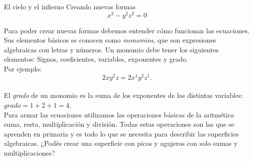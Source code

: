 \begin{surferPage}{El cielo y el infierno}
Creando nuevas formas \\
\smallskip
\[x^2	- y^2z^2	= 0\]

\singlespacing
Para poder crear nuevas formas debemos entender cómo funcionan las ecuaciones. Sus elementos básicos se conocen como  {\it monomios}, que son expresiones algebraicas con letras y números.
\singlespacing
Un monomio debe tener los siguientes elementos:
Signos, coeficientes, variables, exponentes y grado.\\
\singlespacing
Por ejemplo: 
\smallskip
\[2xy^2z = 2x^1y^2z^1.\]
\\
\smallskip
El  {\it grado} de un monomio es la suma de los exponentes de las distintas variables: $grado = 1+2+1=4$.  \\
\singlespacing
Para armar las ecuaciones utilizamos las operaciones básicas de la aritmética suma, resta, multiplicación y división. Todas estas operaciones son las que se aprenden en primaria y es todo lo que se necesita para describir las superficies algebraicas.
\singlespacing
¿Podés crear una superficie con picos y agujeros con solo sumas y multiplicaciones?
\end{surferPage}
